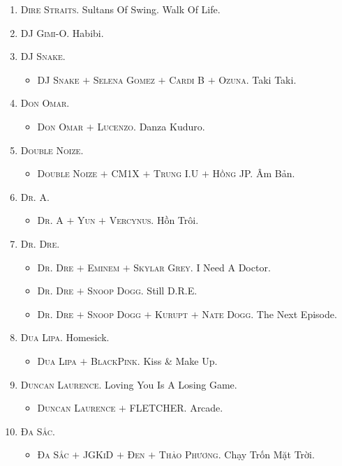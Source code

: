 \documentclass[oneside]{book}
\numberwithin{equation}{section}
\begin{document}
\begin{enumerate}
	\item \textsc{Dire Straits.} Sultans Of Swing. Walk Of Life.
	\item \textsc{DJ Gimi-O.} Habibi.
	\item \textsc{DJ Snake.}
	\begin{itemize}
		\item \textsc{DJ Snake $+$ Selena Gomez $+$ Cardi B $+$ Ozuna.} Taki Taki.
	\end{itemize}
	\item \textsc{Don Omar.}
	\begin{itemize}
		\item \textsc{Don Omar $+$ Lucenzo.} Danza Kuduro.
	\end{itemize}
	\item \textsc{Double Noize.}
	\begin{itemize}
		\item \textsc{Double Noize $+$ CM1X $+$ Trung I.U $+$ Hồng JP.} Âm Bản.
	\end{itemize}
	\item \textsc{Dr. A.}
	\begin{itemize}
		\item \textsc{Dr. A $+$ Yun $+$ Vercynus.} Hồn Trôi.
	\end{itemize}
	\item \textsc{Dr. Dre.}
	\begin{itemize}
		\item \textsc{Dr. Dre $+$ Eminem $+$ Skylar Grey.} I Need A Doctor.
		\item \textsc{Dr. Dre $+$ Snoop Dogg.} Still D.R.E.
		\item \textsc{Dr. Dre $+$ Snoop Dogg $+$ Kurupt $+$ Nate Dogg.} The Next Episode.
	\end{itemize}
	\item \textsc{Dua Lipa.} Homesick.
	\begin{itemize}
		\item \textsc{Dua Lipa $+$ BlackPink.} Kiss \& Make Up.
	\end{itemize}
	\item \textsc{Duncan Laurence.} Loving You Is A Losing Game.
	\begin{itemize}
		\item \textsc{Duncan Laurence $+$ FLETCHER.} Arcade.
	\end{itemize}
	\item \textsc{Đa Sắc.}
	\begin{itemize}
		\item \textsc{Đa Sắc $+$ JGKiD $+$ Đen $+$ Thảo Phương.} Chạy Trốn Mặt Trời.

\end{itemize}
\end{enumerate}
\end{document}

